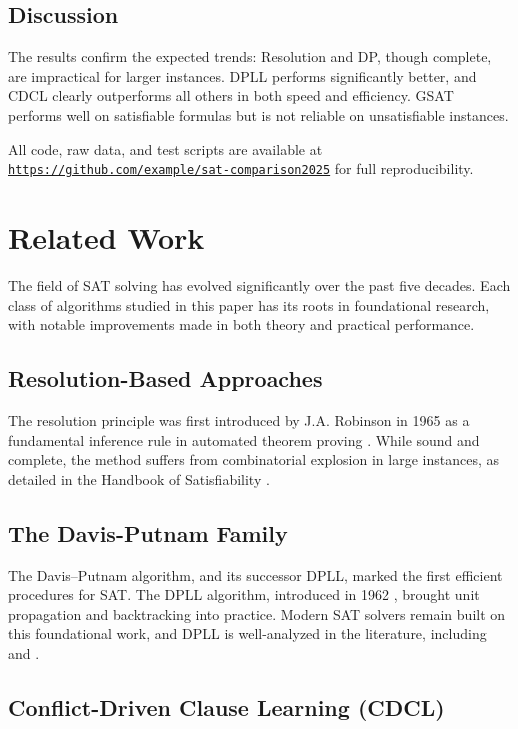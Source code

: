\documentclass[11pt]{article}
\begin{document}
\subsection*{Discussion}

The results confirm the expected trends: Resolution and DP, though complete, are impractical for larger instances. DPLL performs significantly better, and CDCL clearly outperforms all others in both speed and efficiency. GSAT performs well on satisfiable formulas but is not reliable on unsatisfiable instances.

All code, raw data, and test scripts are available at \texttt{\url{https://github.com/example/sat-comparison2025}} for full reproducibility.


\section{Related Work}

The field of SAT solving has evolved significantly over the past five decades. Each class of algorithms studied in this paper has its roots in foundational research, with notable improvements made in both theory and practical performance.

\subsection*{Resolution-Based Approaches}

The resolution principle was first introduced by J.A. Robinson in 1965 as a fundamental inference rule in automated theorem proving \cite{Robinson1965}. While sound and complete, the method suffers from combinatorial explosion in large instances, as detailed in the Handbook of Satisfiability \cite{Biere2009}.

\subsection*{The Davis-Putnam Family}

The Davis–Putnam algorithm, and its successor DPLL, marked the first efficient procedures for SAT. The DPLL algorithm, introduced in 1962 \cite{Davis1962}, brought unit propagation and backtracking into practice. Modern SAT solvers remain built on this foundational work, and DPLL is well-analyzed in the literature, including \cite{Cook1971} and \cite{MarquesSilva1999}.

\subsection*{Conflict-Driven Clause Learning (CDCL)}
\end{document}
